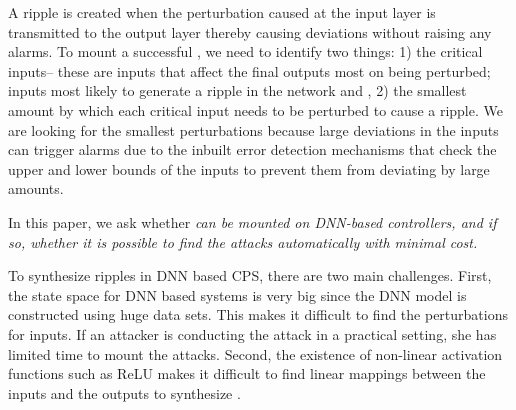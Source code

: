A ripple is created when the perturbation caused at the input layer is transmitted to the output layer thereby causing deviations without raising any alarms. 
To mount a successful \attack, we need to identify two things: 1) the critical inputs-- these are inputs that affect the final outputs most on being perturbed; inputs most likely to generate a ripple in the network and , 2) the smallest amount by which each critical input needs to be perturbed to cause a ripple. We are looking for the smallest perturbations because large deviations in the inputs can trigger alarms due to the inbuilt error detection mechanisms that 
check the upper and lower bounds of the inputs to prevent them from deviating by large amounts.


In this paper, we ask whether { \attack \em can be mounted on DNN-based controllers, and if so, whether it is possible to find the attacks automatically with minimal cost.} 


To synthesize ripples in DNN based CPS, there are two main challenges. First, the state space for DNN based systems is very big since the DNN model is constructed using huge data sets. This makes it difficult to find the perturbations for inputs. If an attacker is conducting the attack in a practical setting, she has limited time to mount the attacks.  %
Second, the existence of non-linear activation functions such as ReLU makes it difficult to find linear mappings between the inputs and the outputs to synthesize \attack.

